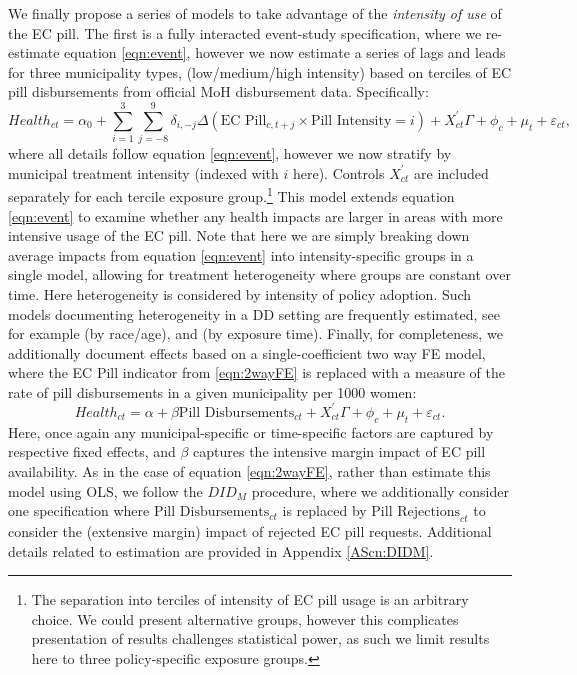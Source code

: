 \documentclass[12pt]{article}
\begin{document}
\begin{spacing}{1.9}
We finally propose a series of models to take advantage of the \emph{intensity of use} of the EC pill. The first is a fully interacted event-study
specification, where we re-estimate equation \ref{eqn:event}, however we now estimate a
series of lags and leads for three municipality types, (low/medium/high intensity)
based on terciles of EC pill disbursements from official MoH disbursement data.
Specifically:
\begin{equation}\label{eqn:eventIntens}
  Health_{ct} = \alpha_0 + \sum_{i=1}^3\sum_{j=-8}^{9}\delta_{i,-j}\Delta \left(\text{EC
    Pill}_{c,t+j}\times\text{Pill Intensity}=i\right) + X_{ct}^\prime\Gamma + \phi_c + \mu_t
  + \varepsilon_{ct},
\end{equation}
where all details follow equation \ref{eqn:event}, however we now stratify by municipal treatment intensity (indexed with $i$
  here).  Controls $X^\prime_{ct}$ are included separately for each tercile exposure
  group.\footnote{The separation into terciles of intensity of EC pill usage is an
  arbitrary choice.  We could present alternative groups, however this complicates
  presentation of results challenges statistical power, as such
  we limit results here to three policy-specific exposure groups.} This model extends equation \ref{eqn:event} to examine whether any health impacts are larger in areas with more intensive usage of the EC pill.  Note that here we are simply breaking down average impacts from equation \ref{eqn:event} into intensity-specific groups in a single model, allowing for treatment heterogeneity where groups are constant over time.  Here heterogeneity is considered by intensity of policy adoption.  Such models documenting heterogeneity in a DD setting are frequently estimated, see for example \citet{BhalotraVenkataramani2015} (by race/age), and \citet{MyersLadd2020} (by exposure time).  Finally, for completeness, we additionally document effects based on a single-coefficient two way FE model, where the EC Pill indicator from \ref{eqn:2wayFE} is replaced with a measure of the rate of pill disbursements in a given municipality per 1000 women:
\begin{equation}
  \label{eqn:DD}
  Health_{ct} = \alpha + \beta \text{Pill Disbursements}_{ct} + X_{ct}^\prime\Gamma +
  \phi_c + \mu_t + \varepsilon_{ct}.
\end{equation}
Here, once again any municipal-specific or time-specific factors are captured by
respective fixed effects, and $\beta$ captures the intensive margin impact of
EC pill availability.  As in the case of equation \ref{eqn:2wayFE}, rather than estimate this model using OLS, we follow the \citet{ChaisemartinDH2019} $DID_M$ procedure, where we additionally consider
one specification where $\text{Pill Disbursements}_{ct}$ is replaced by
$\text{Pill Rejections}_{ct}$ to consider the (extensive margin) impact of rejected EC pill requests. Additional details related to estimation are provided in Appendix \ref{AScn:DIDM}.



\end{spacing}
\end{document}
